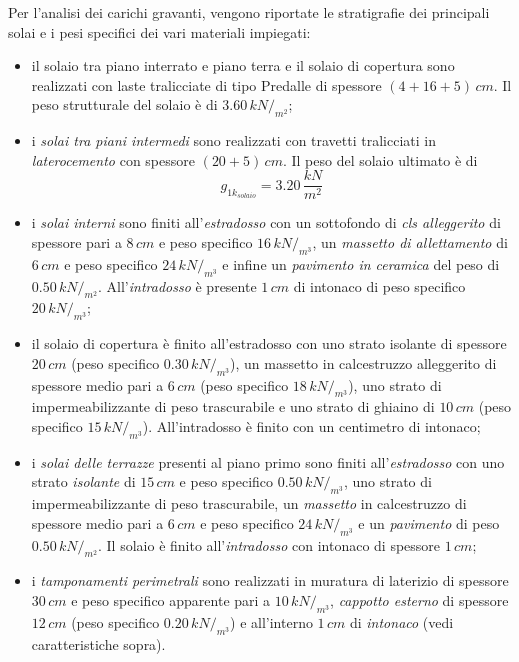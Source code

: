 Per l'analisi dei carichi gravanti, vengono riportate le stratigrafie dei principali solai e i pesi specifici dei vari materiali impiegati:
\begin{itemize}
 \item il solaio tra piano interrato e piano terra e il solaio di copertura sono realizzati con laste tralicciate di tipo Predalle di spessore $(4+16+5)\,\si{cm}$. Il peso strutturale del solaio è di $3.60\,\si{kN}/_{\si{m^2}}$;
 \item i \emph{solai tra piani intermedi} sono realizzati con travetti tralicciati in \emph{laterocemento} con spessore $(20+5)\,\si{cm}$. Il peso del solaio ultimato è di
 \begin{equation*}
  g_{1k_{solaio}} = 3.20\,\dfrac{kN}{m^2}
 \end{equation*}
 \item i \emph{solai interni} sono finiti all'\emph{estradosso} con un sottofondo di \emph{cls alleggerito} di spessore pari a $8\,\si{cm}$ e peso specifico $16\,kN/_{m^3}$, un \emph{massetto di allettamento} di $6\,\si{cm}$ e peso specifico $24\,kN/_{m^3}$ e infine un \emph{pavimento in ceramica} del peso di $0.50\,kN/_{m^2}$. All'\emph{intradosso} è presente $1\,\si{cm}$ di intonaco di peso specifico $20\,kN/_{m^3}$;
 \item il solaio di copertura è finito all'estradosso con uno strato isolante di spessore $20\,cm$ (peso specifico $0.30\,kN/_{m^3}$), un massetto in calcestruzzo alleggerito di spessore medio pari a $6\,cm$ (peso specifico $18\,kN/_{m^3}$), uno strato di impermeabilizzante di peso trascurabile e uno strato di ghiaino di $10\,cm$ (peso specifico $15\,kN/_{m^3}$). All'intradosso è finito con un centimetro di intonaco;
 \item i \emph{solai delle terrazze} presenti al piano primo sono finiti all'\emph{estradosso} con uno strato \emph{isolante} di $15\,\si{cm}$ e peso specifico $0.50\,kN/_{m^3}$, uno strato di impermeabilizzante di peso trascurabile, un \emph{massetto} in calcestruzzo di spessore medio pari a $6\,\si{cm}$ e peso specifico $24\,kN/_{m^3}$ e un \emph{pavimento} di peso $0.50\,kN/_{m^2}$. Il solaio è finito all'\emph{intradosso} con intonaco di spessore $1\,\si{cm}$;
 \item i \emph{tamponamenti perimetrali} sono realizzati in muratura di laterizio di spessore $30\,\si{cm}$ e peso specifico apparente pari a $10\,kN/_{m^3}$, \emph{cappotto esterno} di spessore $12\,\si{cm}$ (peso specifico $0.20\,kN/_{m^3}$) e all'interno $1\,\si{cm}$ di \emph{intonaco} (vedi caratteristiche sopra).
\end{itemize}


